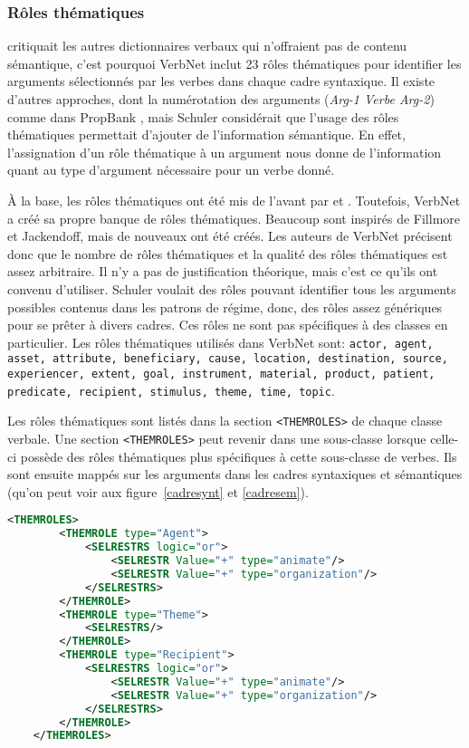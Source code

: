 \subsubsection{Rôles thématiques}
\cite{SchulerVerbnetBroadcoverageComprehensive2005} critiquait les autres dictionnaires verbaux qui n'offraient pas de contenu sémantique, c'est pourquoi VerbNet inclut 23 rôles thématiques pour identifier les arguments sélectionnés par les verbes dans chaque cadre syntaxique. Il existe d'autres approches, dont la numérotation des arguments (\emph{Arg-1 Verbe Arg-2}) comme dans PropBank \citep{PalmerPropositionBankAnnotated2005}, mais Schuler considérait que l'usage des rôles thématiques permettait d'ajouter de l'information sémantique. En effet, l'assignation d'un rôle thématique à un argument nous donne de l'information quant au type d'argument nécessaire pour un verbe donné.

À la base, les rôles thématiques ont été mis de l'avant par  et \cite{Jackendoff1972-JACSII-2}. Toutefois, VerbNet a créé sa propre banque de rôles thématiques. Beaucoup sont inspirés de Fillmore et Jackendoff, mais de nouveaux ont été créés. Les auteurs de VerbNet précisent donc que le nombre de rôles thématiques et la qualité des rôles thématiques est assez arbitraire. Il n'y a pas de justification théorique, mais c'est ce qu'ils ont convenu d'utiliser. Schuler voulait des rôles pouvant identifier tous les arguments possibles contenus dans les patrons de régime, donc, des rôles assez génériques pour se prêter à divers cadres. Ces rôles ne sont pas spécifiques à des classes en particulier.
Les rôles thématiques utilisés dans VerbNet sont: \texttt{actor, agent, asset, attribute, beneficiary, cause, location, destination, source, experiencer, extent, goal, instrument, material, product, patient, predicate, recipient, stimulus, theme, time, topic}.

Les rôles thématiques sont listés dans la section \lstinline|<THEMROLES>| de chaque classe verbale. Une section \lstinline|<THEMROLES>| peut revenir dans une sous-classe lorsque celle-ci possède des rôles thématiques plus spécifiques à cette sous-classe de verbes. Ils sont ensuite mappés sur les arguments dans les cadres syntaxiques et sémantiques (qu'on peut voir aux figure~\ref{cadresynt} et \ref{cadresem}).

\begin{lstlisting}[language=XML, caption = Les rôles thématiques] % Majuscule aux captions
    <THEMROLES>
        <THEMROLE type="Agent">
            <SELRESTRS logic="or">
                <SELRESTR Value="+" type="animate"/>
                <SELRESTR Value="+" type="organization"/>
            </SELRESTRS>
        </THEMROLE>
        <THEMROLE type="Theme">
            <SELRESTRS/>
        </THEMROLE>
        <THEMROLE type="Recipient">
            <SELRESTRS logic="or">
                <SELRESTR Value="+" type="animate"/>
                <SELRESTR Value="+" type="organization"/>
            </SELRESTRS>
        </THEMROLE>
    </THEMROLES>
\end{lstlisting}

